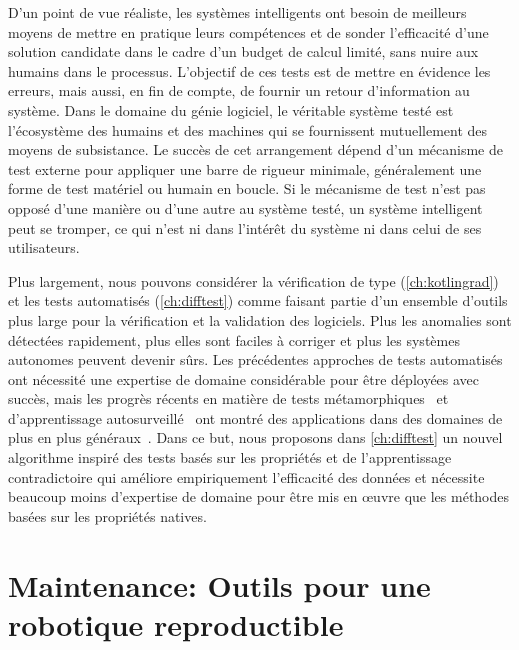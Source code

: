 D'un point de vue réaliste, les systèmes intelligents ont besoin de meilleurs moyens de mettre en pratique leurs compétences et de sonder l'efficacité d'une solution candidate dans le cadre d'un budget de calcul limité, sans nuire aux humains dans le processus. L'objectif de ces tests est de mettre en évidence les erreurs, mais aussi, en fin de compte, de fournir un retour d'information au système. Dans le domaine du génie logiciel, le véritable système testé est l'écosystème des humains et des machines qui se fournissent mutuellement des moyens de subsistance. Le succès de cet arrangement dépend d'un mécanisme de test externe pour appliquer une barre de rigueur minimale, généralement une forme de test matériel ou humain en boucle. Si le mécanisme de test n'est pas opposé d'une manière ou d'une autre au système testé, un système intelligent peut se tromper, ce qui n'est ni dans l'intérêt du système ni dans celui de ses utilisateurs.

Plus largement, nous pouvons considérer la vérification de type (\autoref{ch:kotlingrad}) et les tests automatisés (\autoref{ch:difftest}) comme faisant partie d'un ensemble d'outils plus large pour la vérification et la validation des logiciels. Plus les anomalies sont détectées rapidement, plus elles sont faciles à corriger et plus les systèmes autonomes peuvent devenir sûrs. Les précédentes approches de tests automatisés ont nécessité une expertise de domaine considérable pour être déployées avec succès, mais les progrès récents en matière de tests métamorphiques~\citep{chen1998metamorphic} et d'apprentissage autosurveillé~\citep{lieb2005adaptive} ont montré des applications dans des domaines de plus en plus généraux~\citep{zhang2020testing}. Dans ce but, nous proposons dans \autoref{ch:difftest} un nouvel algorithme inspiré des tests basés sur les propriétés et de l'apprentissage contradictoire qui améliore empiriquement l'efficacité des données et nécessite beaucoup moins d'expertise de domaine pour être mis en œuvre que les méthodes basées sur les propriétés natives.

\section{Maintenance: Outils pour une robotique reproductible}

